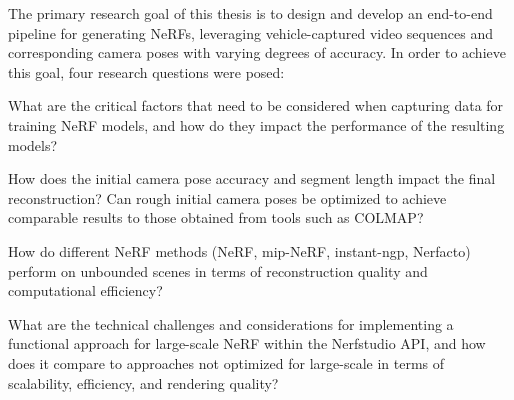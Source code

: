 The primary research goal of this thesis is to design and develop an end-to-end pipeline for generating NeRFs, leveraging vehicle-captured video sequences and corresponding camera poses with varying degrees of accuracy. In order to achieve this goal, four research questions were posed:

\begin{comment}
The research goal for this thesis is:
\begin{description}[leftmargin=!,labelwidth=\widthof{RQ:}]
\item[\textbf{RG:}] Design and develop an end-to-end pipeline for generating NeRFs, leveraging vehicle-captured video sequences and corresponding camera poses with varying degrees of accuracy.
\end{description}

In order to achieve this goal, four research questions were posed:
\end{comment}

\begin{description}[leftmargin=!,labelwidth=\widthof{RQ 1:}]
\item[\textbf{RQ 1:}] What are the critical factors that need to be considered when capturing data for training NeRF models, and how do they impact the performance of the resulting models?

\item[\textbf{RQ 2:}] How does the initial camera pose accuracy and segment length impact the final reconstruction? Can rough initial camera poses be optimized to achieve comparable results to those obtained from tools such as COLMAP?

\item[\textbf{RQ 3:}] How do different NeRF methods (NeRF, mip-NeRF, instant-ngp, Nerfacto) perform on unbounded scenes in terms of reconstruction quality and computational efficiency?

\item[\textbf{RQ 4:}] What are the technical challenges and considerations for implementing a functional approach for large-scale NeRF within the Nerfstudio API, and how does it compare to approaches not optimized for large-scale in terms of scalability, efficiency, and rendering quality?


\end{description}





